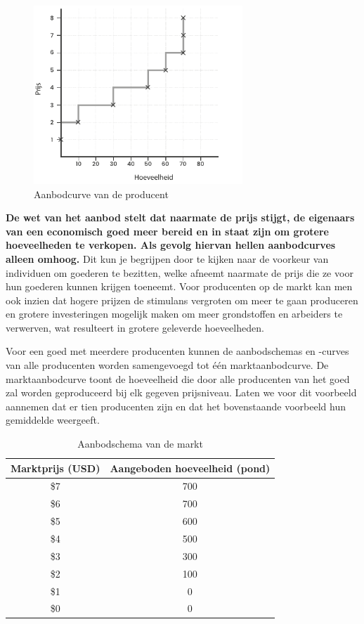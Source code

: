 \begin{figure}[H]
\centering
    \includegraphics[width=0.7\textwidth]{figures/fig24.pdf}
    \caption[Aanbodcurve van de producent]{Aanbodcurve van de producent}
    \label{fig24}
\end{figure}

\textbf{De wet van het aanbod stelt dat naarmate de prijs stijgt, de eigenaars van een economisch goed meer bereid en in staat zijn om grotere hoeveelheden te verkopen. Als gevolg hiervan hellen aanbodcurves alleen omhoog.} Dit kun je begrijpen door te kijken naar de voorkeur van individuen om goederen te bezitten, welke afneemt naarmate de prijs die ze voor hun goederen kunnen krijgen toeneemt. Voor producenten op de markt kan men ook inzien dat hogere prijzen de stimulans vergroten om meer te gaan produceren en grotere investeringen mogelijk maken om meer grondstoffen en arbeiders te verwerven, wat resulteert in grotere geleverde hoeveelheden.

Voor een goed met meerdere producenten kunnen de aanbodschema\textquotesingle s en -curves van alle producenten worden samengevoegd tot één marktaanbodcurve. De marktaanbodcurve toont de hoeveelheid die door alle producenten van het goed zal worden geproduceerd bij elk gegeven prijsniveau. Laten we voor dit voorbeeld aannemen dat er tien producenten zijn en dat het bovenstaande voorbeeld hun gemiddelde weergeeft.

\begin{table}[H]
\centering
\begin{tabular}{|c|c|}  %
\hline  %
    \cellcolor{gray!25}Marktprijs (USD) &
    \cellcolor{gray!25}Aangeboden hoeveelheid (pond) \\
\hline  %
 \$7 & 700 \\ \hline
 \$6 & 700 \\ \hline
 \$5 & 600 \\ \hline
 \$4 & 500 \\ \hline
 \$3 & 300 \\ \hline
 \$2 & 100 \\ \hline
 \$1 & 0  \\ \hline
 \$0 & 0  \\ \hline  %
\end{tabular}
\caption{Aanbodschema van de markt}
\label{tab6}
\end{table}

